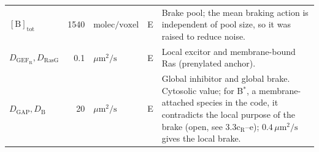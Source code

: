 \begin{table}[!t]
\begin{tabularx}{\textwidth}{@{}l r l c >{\raggedright\arraybackslash}X@{}}
$[\mathrm{B}]_\mathrm{tot}$ & \num{1540} & $\mathrm{molec/voxel}$ & E & Brake pool; the mean braking action is independent of pool size, so it was raised to reduce noise. \\
$D_{\mathrm{GEF_R}},D_{\mathrm{RasG}}$ & \num{0.1} & $\mu\mathrm{m^2/s}$ & E & Local excitor and membrane-bound Ras (prenylated anchor). \\
$D_{\mathrm{GAP}},D_\mathrm{B}$ & \num{20} & $\mu\mathrm{m^2/s}$ & E & Global inhibitor and global brake. Cytosolic value; for B$^*$, a membrane-attached species in the code, it contradicts the local purpose of the brake (open, see 3.3c$_\mathrm{R}$--e); $0.4\,\mu\mathrm{m^2/s}$ gives the local brake. \\
\bottomrule
\end{tabularx}
\end{table}
